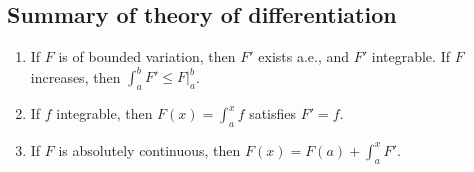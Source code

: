 \subsection{Summary of theory of differentiation}
\begin{enumerate}
	\item If $F$ is of bounded variation, then $F'$ exists a.e., and $F'$ integrable. If $F$ increases, then $\int _a^b F' \le  F|_a^b$.
	\item If $f$ integrable, then  $F(x) = \int _a^x f$ satisfies $F' = f$.
	\item If $F$ is absolutely continuous, then $F(x) = F(a) + \int _a^x F'$.
\end{enumerate}

